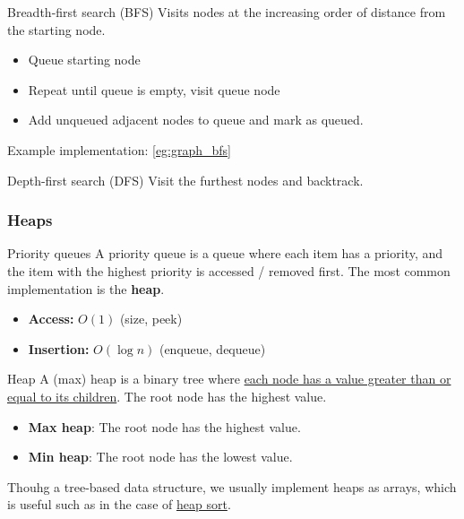 \begin{theorem}
    {Breadth-first search (BFS)}
    Visits nodes at the increasing order of distance from the starting node.
    \begin{itemize}
        \item Queue starting node
        \item Repeat until queue is empty, visit queue node
        \item Add unqueued adjacent nodes to queue and mark as queued.
    \end{itemize}
    \tcblower
    Example implementation: \ref{eg:graph_bfs}
\end{theorem}

\begin{theorem}
    {Depth-first search (DFS)}
    Visit the furthest nodes and backtrack.
\end{theorem}



\subsubsection{Heaps}
\label{subsubsec:heaps}

\begin{theorem}
    {Priority queues}
    A priority queue is a queue where each item has a priority, and the item with the highest priority is accessed / removed first. The most common implementation is the \textbf{heap}.

    \begin{itemize}
        \item \textbf{Access:} $O(1)$ (size, peek)
        \item \textbf{Insertion:} $O(\log n)$ (enqueue, dequeue)
    \end{itemize}
\end{theorem}

\begin{definition}
    {Heap}
    A (max) heap is a binary tree where \underline{each node has a value greater than or equal to its children}. The root node has the highest value.

    \begin{itemize}
        \item \textbf{Max heap}: The root node has the highest value.
        \item \textbf{Min heap}: The root node has the lowest value.
    \end{itemize}

    Thouhg a tree-based data structure, we usually implement heaps as arrays, which is useful such as in the case of \hyperref[def:heapsort]{heap sort}.
\end{definition}

